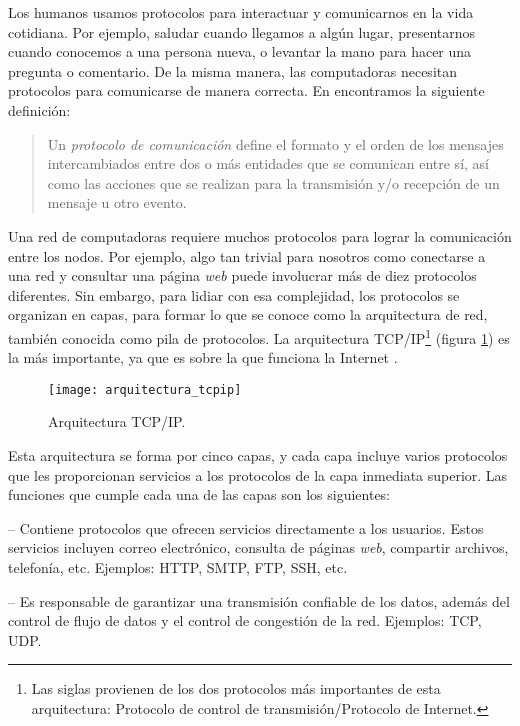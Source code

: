 \label{sec:protocolos_de_comunicacion_y_arquitectura_de_red}

Los humanos usamos protocolos para interactuar y comunicarnos en la vida
cotidiana. Por ejemplo, saludar cuando llegamos a algún lugar, presentarnos
cuando conocemos a una persona nueva, o levantar la mano para hacer una pregunta
o comentario. De la misma manera, las computadoras necesitan protocolos para
comunicarse de manera correcta. En \cite{Kurose2013} encontramos la siguiente
definición:

\begin{quotation}
Un \textit{protocolo de comunicación} define el formato y el orden de los
mensajes intercambiados entre dos o más entidades que se comunican entre sí, así como las
acciones que se realizan para la transmisión y/o recepción de un mensaje u otro
\mbox{evento}.
\end{quotation}

Una red de computadoras requiere muchos protocolos para lograr la comunicación
entre los nodos. Por ejemplo, algo tan trivial para nosotros como conectarse a
una red y consultar una página \textit{web} puede involucrar más de diez
protocolos diferentes. Sin embargo, para lidiar con esa complejidad, los
protocolos se organizan en capas, para formar lo que se conoce como la
arquitectura de red, también conocida como pila de protocolos. La arquitectura
TCP/IP\footnote{Las siglas provienen de los dos protocolos más importantes de
esta arquitectura: Protocolo de control de transmisión/Protocolo de Internet.}
(figura \ref{fig:arquitectura_tcpip}) es la más importante, ya que es sobre la
que funciona la Internet \cite{Kurose2013}.

\begin{figure}[th]
\centering
\texttt{[image: arquitectura\_tcpip]}
\decoRule
\caption[Arquitectura TCP/IP]{Arquitectura TCP/IP.}
\label{fig:arquitectura_tcpip}
\end{figure}

Esta arquitectura se forma por cinco capas, y cada capa incluye varios
protocolos que les proporcionan servicios a los protocolos de la capa inmediata
superior. Las funciones que cumple cada una de las capas son los siguientes:

 -- Contiene protocolos que ofrecen servicios
directamente a los usuarios. Estos servicios incluyen correo electrónico,
consulta de páginas \textit{web}, compartir archivos, telefonía, etc. Ejemplos:
HTTP, SMTP, FTP, SSH, etc.

 -- Es responsable de garantizar una transmisión
confiable de los datos, además del control de flujo de datos y el control de
congestión de la red. Ejemplos: TCP, UDP.

